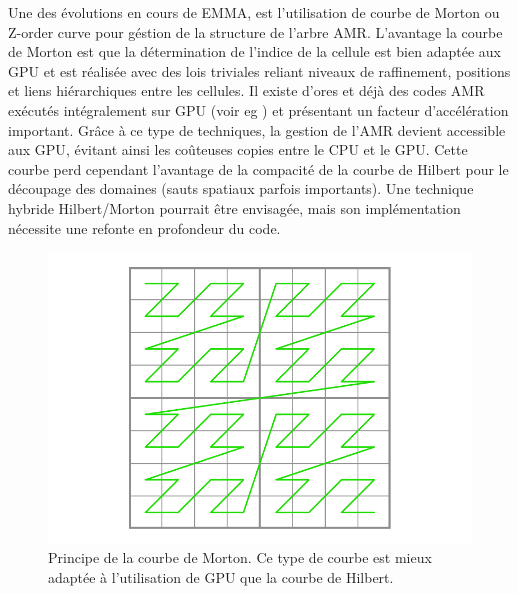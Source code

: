 Une des évolutions en cours de EMMA, est l'utilisation de courbe de Morton ou Z-order curve \citep{morton1966computer} pour géstion de la structure de l'arbre \ac{AMR}.
L'avantage la courbe de Morton est que la détermination de l'indice de la cellule est bien adaptée aux \ac{GPU} et est réalisée avec des lois triviales reliant niveaux de raffinement, positions et liens hiérarchiques entre les cellules.
Il existe d'ores et déjà des codes \ac{AMR} exécutés intégralement sur \ac{GPU} (voir eg \cite{2012ASPC..453..325B}) et présentant un facteur d'accélération important.
Grâce à ce type de techniques, la gestion de l'\ac{AMR} devient accessible aux \ac{GPU}, évitant ainsi les coûteuses copies entre le \ac{CPU} et le \ac{GPU}.
Cette courbe perd cependant l'avantage de la compacité de la courbe de Hilbert pour le découpage des domaines (sauts spatiaux parfois importants).
Une technique hybride Hilbert/Morton pourrait être envisagée, mais son implémentation nécessite une refonte en profondeur du code.

\begin{figure}
        \includegraphics[width=.95\linewidth]{img/02/ZCurve.png} 
        \caption[Courbe de Morton]{Principe de la courbe de Morton.
        Ce type de courbe est mieux adaptée à l'utilisation de \ac{GPU} que la courbe de Hilbert.
 		\label{fig:hilbert}}
\end{figure}





